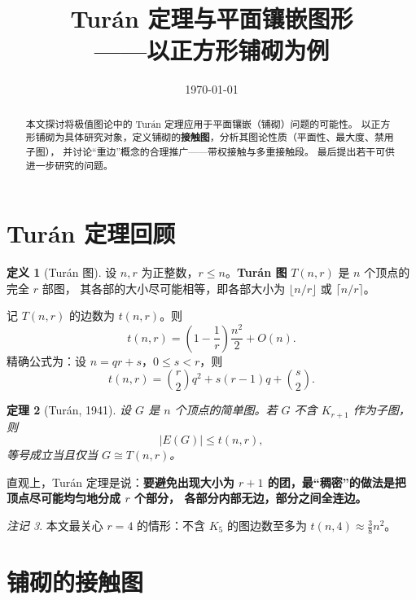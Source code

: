 \documentclass[12pt,a4paper]{article}
\title{\bfseries Turán 定理与平面镶嵌图形\\——以正方形铺砌为例}
\author{}
\date{\today}
\theoremstyle{plain}
\newtheorem{theorem}{定理}[section]
\theoremstyle{definition}
\newtheorem{definition}[theorem]{定义}
\theoremstyle{remark}
\newtheorem{remark}[theorem]{注记}
\begin{document}
\maketitle

\begin{abstract}
本文探讨将极值图论中的 Turán 定理应用于平面镶嵌（铺砌）问题的可能性。
以正方形铺砌为具体研究对象，定义铺砌的\textbf{接触图}，分析其图论性质（平面性、最大度、禁用子图），
并讨论``重边''概念的合理推广——带权接触与多重接触段。
最后提出若干可供进一步研究的问题。
\end{abstract}

\tableofcontents

\section{Turán 定理回顾}

\begin{definition}[Turán 图]
设 $n,r$ 为正整数，$r \le n$。\textbf{Turán 图} $T(n,r)$ 是 $n$ 个顶点的完全 $r$ 部图，
其各部的大小尽可能相等，即各部大小为 $\lfloor n/r \rfloor$ 或 $\lceil n/r \rceil$。
\end{definition}

记 $T(n,r)$ 的边数为 $t(n,r)$。则
\begin{equation}\label{eq:turan-edge}
t(n,r) = \left(1 - \frac{1}{r}\right)\frac{n^2}{2} + O(n) .
\end{equation}
精确公式为：设 $n = qr + s$，$0 \le s < r$，则
\[
t(n,r) = \binom{r}{2} q^2 + s(r-1)q + \binom{s}{2}.
\]

\begin{theorem}[Turán, 1941]\label{thm:turan}
设 $G$ 是 $n$ 个顶点的简单图。若 $G$ 不含 $K_{r+1}$ 作为子图，则
\[
|E(G)| \le t(n,r),
\]
等号成立当且仅当 $G \cong T(n,r)$。
\end{theorem}

直观上，Turán 定理是说：\textbf{要避免出现大小为 $r+1$ 的团，最``稠密''的做法是把顶点尽可能均匀地分成 $r$ 个部分，
各部分内部无边，部分之间全连边。}

\begin{remark}
本文最关心 $r=4$ 的情形：不含 $K_5$ 的图边数至多为 $t(n,4) \approx \frac{3}{8}n^2$。
\end{remark}

\section{铺砌的接触图}
\end{document}
